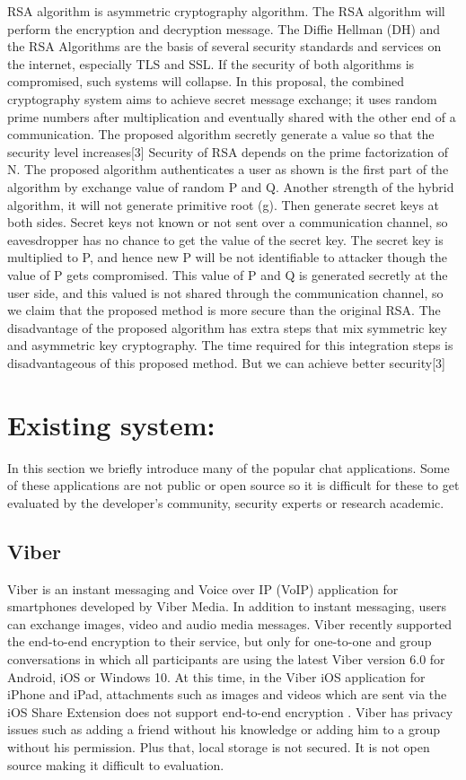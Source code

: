 RSA algorithm is asymmetric cryptography algorithm. The RSA algorithm will perform the encryption and decryption message. The Diffie Hellman (DH) and the RSA Algorithms are the basis of several security standards and services on the internet, especially TLS and SSL. If the security of both algorithms is compromised, such systems will collapse. In this proposal, the combined cryptography system aims to achieve secret message exchange; it uses random prime numbers after multiplication and eventually shared with the other end of a communication. The proposed algorithm secretly generate a value so that the security level increases[3]
Security of RSA depends on the prime factorization of N. The proposed algorithm authenticates a user as shown is the first part of the algorithm by exchange value of random P and Q. Another strength of the hybrid algorithm, it will not generate primitive root (g). Then generate secret keys at both sides. Secret keys not known or not sent over a communication channel, so eavesdropper has no chance to get the value of the secret key. The secret key is multiplied to P, and hence new P will be not identifiable to attacker though the value of P gets compromised. This value of P and Q is generated secretly at the user side, and this valued is not shared through the communication channel, so we claim that the proposed method is more secure than the original RSA. The disadvantage of the proposed algorithm has extra steps that mix symmetric key and asymmetric key cryptography. The time required for this integration steps is disadvantageous of this proposed method. But we can achieve better security[3]


\section{Existing system:}
In this section we briefly introduce many of the popular chat applications. Some of these applications are not public or open source so it is difficult for these to get evaluated by the developer’s community, security experts or research academic.

\subsection{Viber}
Viber is an instant messaging and Voice over IP (VoIP) application for smartphones developed by Viber Media. In addition to instant messaging, users can exchange images,
video and audio media messages. Viber recently supported the end-to-end encryption to their service, but only for one-to-one and group conversations in which all
participants are using the latest Viber version 6.0 for Android, iOS or Windows 10. At this time, in the Viber iOS application for iPhone and iPad, attachments such as images and videos which are sent via the iOS Share Extension does not support end-to-end encryption .\cite{shyam} Viber has privacy issues such as adding a friend without his knowledge or adding him to a group without his permission. Plus that, local storage is not secured. It is not
open source making it difficult to evaluation.

